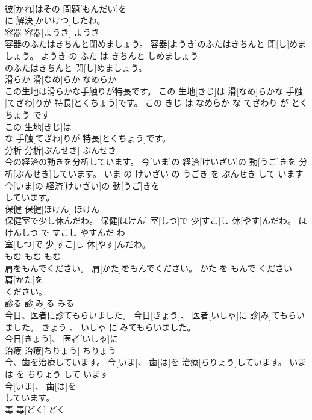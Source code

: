 \documentclass[8pt]{extreport}
\begin{document}
\begin{CJK}{UTF8}{min}
\\	彼[かれ]はその 問題[もんだい]を
\\	に 解決[かいけつ]したわ。			
\\	容器	容器[ようき]	ようき	
\\	容器のふたはきちんと閉めましょう。	容器[ようき]のふたはきちんと 閉[し]めましょう。	ようき の ふた は きちんと しめましょう	
\\	のふたはきちんと 閉[し]めましょう。			
\\	滑らか	滑[なめ]らか	なめらか	
\\	この生地は滑らかな手触りが特長です。	この 生地[きじ]は 滑[なめ]らかな 手触[てざわ]りが 特長[とくちょう]です。	この きじ は なめらか な てざわり が とくちょう です	
\\	この 生地[きじ]は
\\	な 手触[てざわ]りが 特長[とくちょう]です。			
\\	分析	分析[ぶんせき]	ぶんせき	
\\	今の経済の動きを分析しています。	今[いま]の 経済[けいざい]の 動[うご]きを 分析[ぶんせき]しています。	いま の けいざい の うごき を ぶんせき して います	
\\	今[いま]の 経済[けいざい]の 動[うご]きを
\\	しています。			
\\	保健	保健[ほけん]	ほけん	
\\	保健室で少し休んだわ。	保健[ほけん] 室[しつ]で 少[すこ]し 休[やす]んだわ。	ほけんしつ で すこし やすんだ わ	
\\	室[しつ]で 少[すこ]し 休[やす]んだわ。			
\\	もむ	もむ	もむ	
\\	肩をもんでください。	肩[かた]をもんでください。	かた を もんで ください	
\\	肩[かた]を
\\	ください。			
\\	診る	診[み]る	みる	
\\	今日、医者に診てもらいました。	今日[きょう]、 医者[いしゃ]に 診[み]てもらいました。	きょう 、 いしゃ に みてもらいました。	
\\	今日[きょう]、 医者[いしゃ]に
\\	治療	治療[ちりょう]	ちりょう	
\\	今、歯を治療しています。	今[いま]、 歯[は]を 治療[ちりょう]しています。	いま は を ちりょう して います	
\\	今[いま]、 歯[は]を
\\	しています。			
\\	毒	毒[どく]	どく	

\end{CJK}
\end{document}
